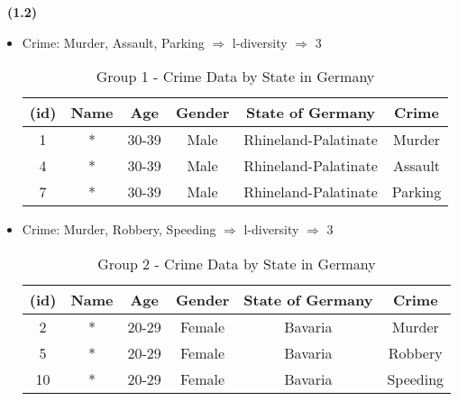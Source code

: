 \documentclass[a4 paper]{article}
\numberwithin{equation}{section}
\newcommand{\subproblem}[1]{~\newline\textbf{(#1)}}
\newcommand{\0}{\mathbf{0}}
\begin{document}
\subproblem{1.2}

\begin{itemize}
    \item Crime: Murder, Assault, Parking $\Rightarrow$ l-diversity $\Rightarrow$ 3
    \begin{table}[H]
        \centering
        \caption{Group 1 - Crime Data by State in Germany}
        \label{tab:crime_data-1}
        \begin{tabular}{cccccc}
            \toprule
            \textbf{(id)} & \textbf{Name} & \textbf{Age} & \textbf{Gender} & \textbf{State of Germany} & \textbf{Crime} \\ \midrule
            1  & *  & 30-39  & Male   & Rhineland-Palatinate   & Murder   \\ \midrule
            4  & *  & 30-39  & Male   & Rhineland-Palatinate   & Assault  \\ \midrule
            7  & *  & 30-39  & Male   & Rhineland-Palatinate   & Parking  \\ \bottomrule
        \end{tabular}
    \end{table}

    \pagebreak
        
    \item Crime: Murder, Robbery, Speeding $\Rightarrow$ l-diversity $\Rightarrow$ 3
    \begin{table}[H]
        \centering
        \caption{Group 2 - Crime Data by State in Germany}
        \label{tab:crime_data-2}
        \begin{tabular}{cccccc}
            \toprule
            \textbf{(id)} & \textbf{Name} & \textbf{Age} & \textbf{Gender} & \textbf{State of Germany} & \textbf{Crime} \\ \midrule
            2  & *  & 20-29  & Female & Bavaria                & Murder   \\ \midrule
            5  & *  & 20-29  & Female & Bavaria                & Robbery  \\ \midrule
            10 & *  & 20-29  & Female & Bavaria                & Speeding \\ \bottomrule
        \end{tabular}
    \end{table}


\end{itemize}
\end{document}
